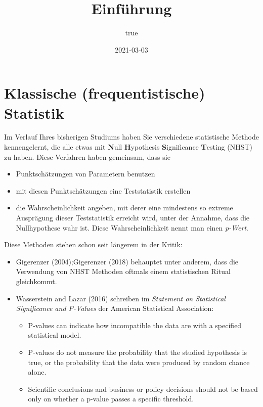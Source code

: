 \documentclass[]{tufte-handout}
\title{Einführung}
\author{true}
\date{2021-03-03}
\providecommand{\tightlist}{%
  \setlength{\itemsep}{0pt}\setlength{\parskip}{0pt}}
\begin{document}
\maketitle




\hypertarget{klassische-frequentistische-statistik}{%
\section{Klassische (frequentistische)
Statistik}\label{klassische-frequentistische-statistik}}

Im Verlauf Ihres bisherigen Studiums haben Sie verschiedene statistische
Methode kennengelernt, die alle etwas mit \textbf{N}ull
\textbf{H}ypothesis \textbf{S}ignificance \textbf{T}esting (NHST) zu
haben. Diese Verfahren haben gemeinsam, dass sie

\begin{itemize}
\tightlist
\item
  Punktschätzungen von Parametern benutzen
\item
  mit diesen Punktschätzungen eine Teststatistik erstellen
\item
  die Wahrscheinlichkeit angeben, mit derer eine mindestens so extreme
  Ausprägung dieser Teststatistik erreicht wird, unter der Annahme, dass
  die Nullhypothese wahr ist. Diese Wahrscheinlichkeit nennt man einen
  \emph{p-Wert}.
\end{itemize}

Diese Methoden stehen schon seit längerem in der Kritik:

\begin{itemize}
\item
  Gigerenzer (2004);Gigerenzer (2018) behauptet unter anderem, dass die
  Verwendung von NHST Methoden oftmals einem statistischen Ritual
  gleichkommt.
\item
  Wasserstein and Lazar (2016) schreiben im \emph{Statement on
  Statistical Significance and P-Values} der American Statistical
  Association:

  \begin{itemize}
  \tightlist
  \item
    P-values can indicate how incompatible the data are with a specified
    statistical model.
  \item
    P-values do not measure the probability that the studied hypothesis
    is true, or the probability that the data were produced by random
    chance alone.
  \item
    Scientific conclusions and business or policy decisions should not
    be based only on whether a p-value passes a specific threshold.
  \end{itemize}
\end{itemize}
\end{document}
